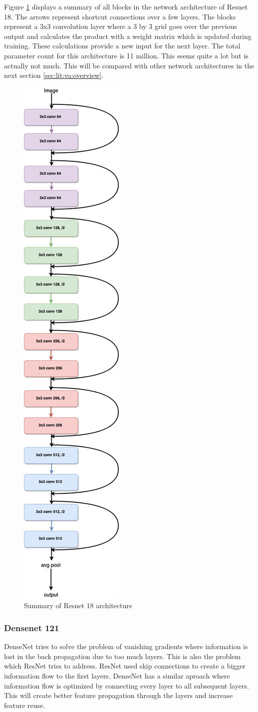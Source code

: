 			Figure \ref{fig:vis:resnet18summary} displays a summary of all blocks in the network architecture of Resnet 18. The arrows represent shortcut connections over a few layers. The blocks represent a 3x3 convolution layer where a 3 by 3 grid goes over the previous output and calculates the product with a weight matrix which is updated during training. These calculations provide a new input for the next layer.  The total parameter count for this architecture is 11 million. This seems quite a lot but is actually not much. This will be compared with other network architectures in the next section \ref{sec:lit:va:overview}.
			
			\begin{figure}[hbtp]
			\centering
			\includegraphics[height=\textwidth, angle=90]{fig/Research/Vision_Algorithm/algorithms/Resnet/Resnet18Diagram.png}
			\caption{Summary of Resnet 18 architecture}
			\label{fig:vis:resnet18summary}
			\end{figure}
			
		\subsubsection{Densenet 121}
		DenseNet \citep{Huang2017} tries to solve the problem of vanishing gradients where information is lost in the back propagation due to too much layers. This is also the problem which ResNet tries to address. ResNet used skip connections to create a bigger information flow to the first layers. DenseNet has a similar aproach where information flow is optimized by connecting every layer to all subsequent layers. This will create better feature propagation through the layers and increase feature reuse. 
		
